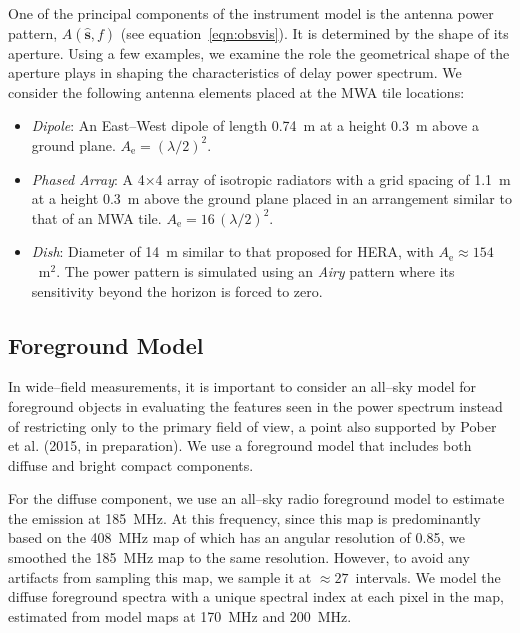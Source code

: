 \documentclass[preprint2,iop,numberedappendix,twocolappendix,appendixfloats]{emulateapj}
\begin{document}
One of the principal components of the instrument model is the antenna power pattern, $A(\hat{\boldsymbol{s}},f)$ (see equation~\ref{eqn:obsvis}). It is determined by the shape of its aperture. Using a few examples, we examine the role the geometrical shape of the aperture plays in shaping the characteristics of delay power spectrum. We consider the following antenna elements placed at the MWA tile locations:
\begin{itemize}
\item {\it Dipole}: An East--West dipole of length 0.74~m at a height 0.3~m above a ground plane. $A_\textrm{e}=(\lambda/2)^2$.
\item {\it Phased Array}: A 4$\times$4 array of isotropic radiators with a grid spacing of 1.1~m at a height 0.3~m above the ground plane placed in an arrangement similar to that of an MWA tile. $A_\textrm{e}=16\,(\lambda/2)^2$. 
\item {\it Dish}: Diameter of 14~m similar to that proposed for HERA, with $A_\textrm{e}\approx 154$~m$^2$. The power pattern is simulated using an {\it Airy} pattern where its sensitivity beyond the horizon is forced to zero.
\end{itemize}

\subsection{Foreground Model}\label{sec:foreground}

In wide--field measurements, it is important to consider an all--sky model for foreground objects in evaluating the features seen in the power spectrum instead of restricting only to the primary field of view, a point also supported by Pober et al. (2015, in preparation). We use a foreground model that includes both diffuse and bright compact components. 

For the diffuse component, we use an all--sky radio foreground model \citep{deo08} to estimate the emission at 185~MHz. At this frequency, since this map is predominantly based on the 408~MHz map of \citet{has82} which has an angular resolution of 0.85\arcdeg, we smoothed the 185~MHz map to the same resolution. However, to avoid any artifacts from sampling this map, we sample it at $\approx 27$\arcmin~intervals. We model the diffuse foreground spectra with a unique spectral index at each pixel in the map, estimated from model maps at 170~MHz and 200~MHz.
\end{document}

